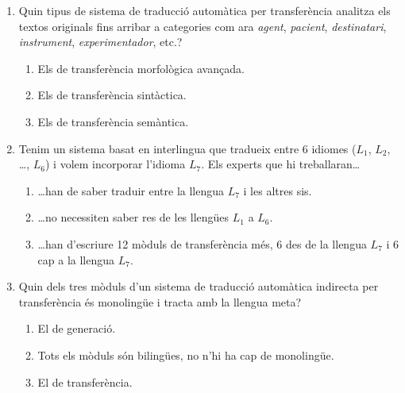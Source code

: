 \begin{enumerate}
\item Quin tipus de sistema de traducció automàtica per transferència
  analitza els textos originals fins arribar a categories com ara
  \emph{agent}, \emph{pacient}, \emph{destinatari}, \emph{instrument},
  \emph{experimentador}, etc.?
  \begin{enumerate}
  \item Els de transferència morfològica avançada.
  \item Els de transferència sintàctica.
  \item Els de transferència semàntica.
  \end{enumerate}

\item Tenim un sistema basat en interlingua que tradueix entre 6
  idiomes ($L_1$, $L_2$, \ldots, $L_6$) i volem incorporar l'idioma
  $L_7$. Els experts que hi treballaran\ldots
  \begin{enumerate}
  \item \ldots han de saber traduir entre la llengua $L_7$ i les
    altres sis.
  \item \ldots no necessiten saber res de les llengües $L_1$ a $L_6.$
  \item \ldots han d'escriure 12 mòduls de transferència més, 6 des de
    la llengua $L_7$ i 6 cap a la llengua $L_7$.
  \end{enumerate}


\item Quin dels tres mòduls d'un sistema de traducció automàtica
  indirecta per transferència és monolingüe i tracta amb la llengua
  meta?
  \begin{enumerate}
  \item El de generació.
  \item Tots els mòduls són bilingües, no n'hi ha cap de monolingüe.
  \item El de transferència.
  \end{enumerate}


\end{enumerate}

